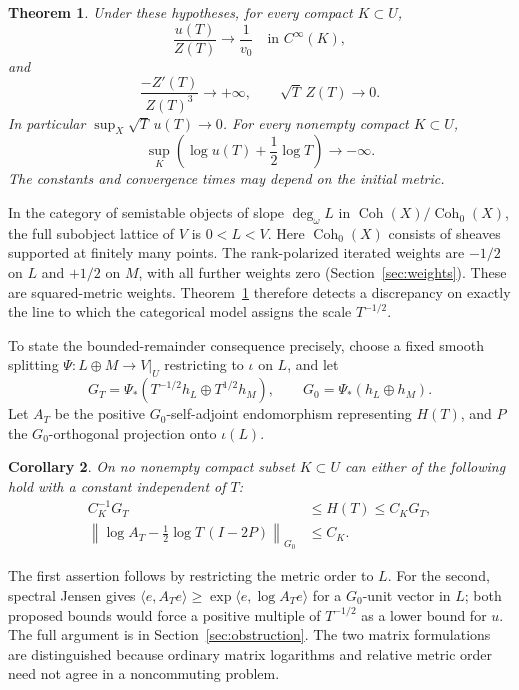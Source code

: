 \documentclass[11pt]{amsart}
\newtheorem{theorem}{Theorem}[section]
\newtheorem{corollary}[theorem]{Corollary}
\theoremstyle{definition}
\theoremstyle{remark}
\newcommand{\Coh}{\operatorname{Coh}}
\begin{document}
\begin{theorem}\label{thm:flow}
Under these hypotheses, for every compact $K\subset U$,
\begin{equation}\label{eq:intro-normalized}
 \frac{u(T)}{Z(T)}\longrightarrow\frac1{v_0}
       \quad\text{in }C^\infty(K),
\end{equation}
and
\begin{equation}\label{eq:intro-decay}
 \frac{-Z'(T)}{Z(T)^3}\longrightarrow+\infty,
 \qquad\sqrt T\,Z(T)\longrightarrow0.
\end{equation}
In particular $\sup_X\sqrt T\,u(T)\to0$. For every nonempty compact
$K\subset U$,
\begin{equation}\label{eq:intro-log}
 \sup_K\left(\log u(T)+\frac12\log T\right)\longrightarrow-\infty.
\end{equation}
The constants and convergence times may depend on the initial metric.
\end{theorem}

In the category of semistable objects of slope $\deg_\omega L$ in
$\Coh(X)/\Coh_0(X)$, the full subobject lattice of $V$ is $0<L<V$.
Here $\Coh_0(X)$ consists of sheaves supported at finitely many points.
The rank-polarized iterated weights are $-1/2$ on $L$ and $+1/2$ on $M$,
with all further weights zero (Section~\ref{sec:weights}). These are
squared-metric weights. Theorem~\ref{thm:flow} therefore detects a
discrepancy on exactly the line to which the categorical model assigns
the scale $T^{-1/2}$.

To state the bounded-remainder consequence precisely, choose a fixed
smooth splitting $\Psi:L\oplus M\to V|_U$ restricting to $\iota$ on
$L$, and let
\[
 G_T=\Psi_*(T^{-1/2}h_L\oplus T^{1/2}h_M),\qquad
 G_0=\Psi_*(h_L\oplus h_M).
\]
Let $A_T$ be the positive $G_0$-self-adjoint endomorphism representing
$H(T)$, and $P$ the $G_0$-orthogonal projection onto $\iota(L)$.

\begin{corollary}\label{cor:intro}
On no nonempty compact subset $K\subset U$ can either of the following
hold with a constant independent of $T$:
\begin{align}
 C_K^{-1}G_T&\le H(T)\le C_KG_T,\label{eq:intro-order}\\
 \left\|\log A_T-\tfrac12\log T\,(I-2P)\right\|_{G_0}
       &\le C_K.\label{eq:intro-matrix-log}
\end{align}
\end{corollary}

The first assertion follows by restricting the metric order to $L$.
For the second, spectral Jensen gives
$\langle e,A_Te\rangle\ge\exp\langle e,\log A_Te\rangle$ for a
$G_0$-unit vector in $L$; both proposed bounds would force a positive
multiple of $T^{-1/2}$ as a lower bound for $u$.
The full argument is in Section~\ref{sec:obstruction}.
The two matrix formulations are distinguished because ordinary matrix
logarithms and relative metric order need not agree in a noncommuting
problem.
\end{document}
